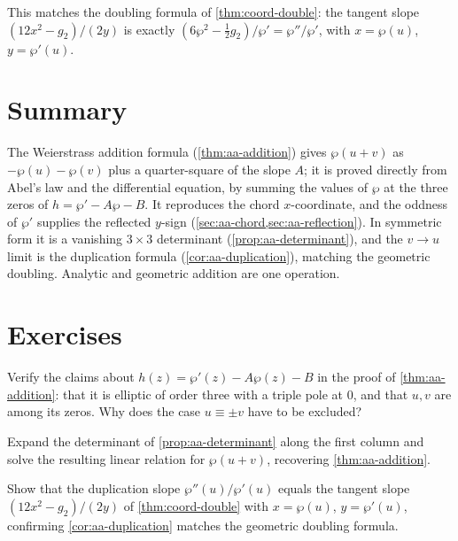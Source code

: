 This matches the doubling formula of \cref{thm:coord-double}: the tangent slope
\((12 x^2 - g_2)/(2y)\) is exactly \((6\wp^2 - \tfrac12 g_2)/\wp' =
\wp''/\wp'\), with \(x = \wp(u)\), \(y = \wp'(u)\).

\section{Summary}
\label{sec:aa-summary}

The Weierstrass addition formula (\cref{thm:aa-addition}) gives \(\wp(u+v)\) as
\(-\wp(u) - \wp(v)\) plus a quarter-square of the slope \(A\); it is proved
directly from Abel's law and the differential equation, by summing the values of
\(\wp\) at the three zeros of \(h = \wp' - A\wp - B\). It reproduces the chord
\(x\)-coordinate, and the oddness of \(\wp'\) supplies the reflected \(y\)-sign
(\cref{sec:aa-chord,sec:aa-reflection}). In symmetric form it is a vanishing
\(3 \times 3\) determinant (\cref{prop:aa-determinant}), and the \(v \to u\) limit
is the duplication formula (\cref{cor:aa-duplication}), matching the geometric
doubling. Analytic and geometric addition are one operation.

\section*{Exercises}

\begin{exercise}
\label{ex:aa-h-order}
Verify the claims about \(h(z) = \wp'(z) - A\wp(z) - B\) in the proof of
\cref{thm:aa-addition}: that it is elliptic of order three with a triple pole at
\(0\), and that \(u, v\) are among its zeros. Why does the case
\(u \equiv \pm v\) have to be excluded?
\end{exercise}

\begin{exercise}
\label{ex:aa-determinant-expand}
Expand the determinant of \cref{prop:aa-determinant} along the first column and
solve the resulting linear relation for \(\wp(u+v)\), recovering
\cref{thm:aa-addition}.
\end{exercise}

\begin{exercise}
\label{ex:aa-duplication-match}
Show that the duplication slope \(\wp''(u)/\wp'(u)\) equals the tangent slope
\((12x^2 - g_2)/(2y)\) of \cref{thm:coord-double} with \(x = \wp(u)\),
\(y = \wp'(u)\), confirming \cref{cor:aa-duplication} matches the geometric
doubling formula.
\end{exercise}

